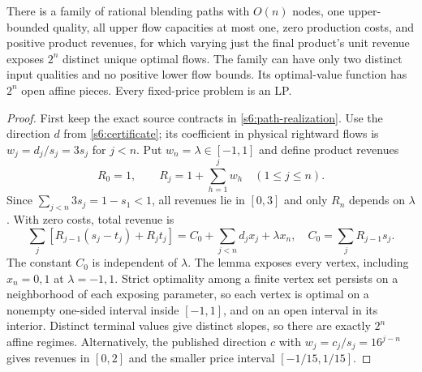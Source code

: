 \begin{theorem}\label{s6:price-response}
There is a family of rational blending paths with $O(n)$ nodes, one
upper-bounded quality, all upper flow capacities at most one, zero
production costs, and positive product revenues, for which varying just
the final product's unit revenue exposes $2^n$ distinct unique optimal
flows. The family can have only two distinct input qualities and no
positive lower flow bounds. Its optimal-value function has $2^n$
open affine pieces. Every fixed-price problem is an LP.
\end{theorem}
\begin{proof}
First keep the exact source contracts in \cref{s6:path-realization}.
Use the direction $d$ from \cref{s6:certificate}; its coefficient in
physical rightward flows is $w_j=d_j/s_j=3s_j$ for $j<n$.
Put $w_n=\lambda\in[-1,1]$ and define product revenues
\[
 R_0=1,\qquad R_j=1+\sum_{h=1}^j w_h\quad(1\le j\le n).
\]
Since $\sum_{j<n}3s_j=1-s_1<1$, all revenues lie in $[0,3]$ and only
$R_n$ depends on $\lambda$. With zero costs, total revenue is
\begin{equation}
 \sum_j[R_{j-1}(s_j-t_j)+R_jt_j]
 =C_0+\sum_{j<n}d_jx_j+\lambda x_n,
 \quad C_0=\sum_jR_{j-1}s_j.\label{s6:price-identity}
\end{equation}
The constant $C_0$ is independent of $\lambda$. The lemma exposes every
vertex, including $x_n=0,1$ at $\lambda=-1,1$. Strict optimality among a
finite vertex set persists on a neighborhood of each exposing parameter,
so each vertex is optimal on a nonempty one-sided interval inside $[-1,1]$, and on an open
interval in its interior. Distinct terminal values give distinct slopes,
so there are exactly $2^n$ affine regimes. Alternatively, the published
direction $c$ with $w_j=c_j/s_j=16^{j-n}$ gives revenues in $[0,2]$
and the smaller price interval $[-1/15,1/15]$.


\end{proof}
